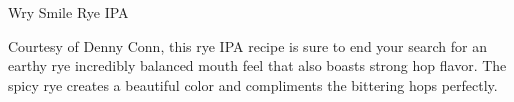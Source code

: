 \stylesection{\stylegermanwheatandryebeer}

\begin{recipie}{Wry Smile Rye IPA}

\begin{aboutblock}
Courtesy of Denny Conn, this rye IPA recipe is sure to end your search for
an earthy rye incredibly balanced mouth feel that also boasts strong hop flavor.
The spicy rye creates a beautiful color and compliments the bittering hops
perfectly. 
\end{aboutblock}


\begin{methodandtiming}

\begin{mashsteps}
\end{mashsteps}

\begin{fermentationsteps}
\end{fermentationsteps}

\end{methodandtiming}

\pagebreak

\begin{ingredientsblock}

\begin{malts}
\end{malts}

\begin{hops}
\end{hops}


\end{ingredientsblock}

\end{recipie}